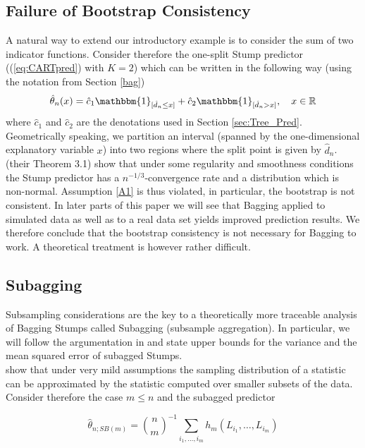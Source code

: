 \subsection{Failure of Bootstrap Consistency}
A natural way to extend our introductory example is to consider the sum of two indicator functions.
Consider therefore the one-split Stump predictor ((\ref{eq:CARTpred}) with $K=2$) which can be written in the following way (using the notation from Section \ref{bag})
\begin{equation}\label{stump}
\hat{\theta}_{n}(x) = \hat{c}_1 \mathbbm{1}_{[\hat{d}_{n} \leq x]} + \hat{c}_2 \mathbbm{1}_{[\hat{d}_{n} > x]}, \quad x\in \mathbb{R}
\end{equation}
where $\hat{c}_1$ and $\hat{c}_2$ are the denotations used in Section \ref{sec:Tree_Pred}. Geometrically speaking, we partition an interval (spanned by the one-dimensional explanatory variable $x$) into two regions where the split point is given by $\hat{d}_n$.\\
\cite{Buhlmann2002} (their Theorem 3.1) show that under some regularity and smoothness conditions the Stump predictor has a $n^{-1/3}$-convergence rate and a distribution which is non-normal.
Assumption \ref{A1} is thus violated, in particular, the bootstrap is not consistent.
In later parts of this paper we will see that Bagging applied to simulated data as well as to a real data set yields improved prediction results.
We therefore conclude that the bootstrap consistency is not necessary for Bagging to work. A theoretical treatment is however rather difficult.

\subsection{Subagging}\label{sec:Subagging}
Subsampling considerations are the key to a theoretically more traceable analysis of Bagging Stumps called Subagging (subsample aggregation).
In particular, we will follow the argumentation in \cite{Buhlmann2002} and state upper bounds for the variance and the mean squared error of subagged Stumps.\\
\cite{politis1994} show that under very mild assumptions the sampling distribution of a statistic can be approximated by the statistic computed over smaller subsets of the data.\\
Consider therefore the case $m \leq n$ and the subagged predictor

$$
\hat{\theta}_{n;SB(m)}=\binom{n}{m}^{-1} \sum_{i_{1}, \dots, i_{m}}h_{m}(L_{i_{1}}, \dots, L_{i_{m}})
$$

